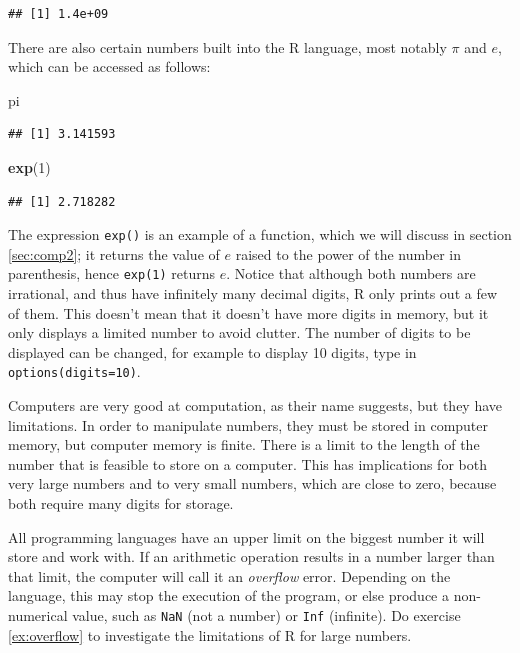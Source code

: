 \documentclass[
]{book}
\newenvironment{Shaded}{\begin{snugshade}}{\end{snugshade}}
\newcommand{\DecValTok}[1]{\textcolor[rgb]{0.00,0.00,0.81}{#1}}
\newcommand{\KeywordTok}[1]{\textcolor[rgb]{0.13,0.29,0.53}{\textbf{#1}}}
\newcommand{\NormalTok}[1]{#1}
\begin{document}
\begin{verbatim}
## [1] 1.4e+09
\end{verbatim}

There are also certain numbers built into the R language, most notably \(\pi\) and \(e\), which can be accessed as follows:

\begin{Shaded}
\begin{Highlighting}[]
\NormalTok{pi}
\end{Highlighting}
\end{Shaded}

\begin{verbatim}
## [1] 3.141593
\end{verbatim}

\begin{Shaded}
\begin{Highlighting}[]
\KeywordTok{exp}\NormalTok{(}\DecValTok{1}\NormalTok{)}
\end{Highlighting}
\end{Shaded}

\begin{verbatim}
## [1] 2.718282
\end{verbatim}

The expression \texttt{exp()} is an example of a function, which we will discuss in section \ref{sec:comp2}; it returns the value of \(e\) raised to the power of the number in parenthesis, hence \texttt{exp(1)} returns \(e\). Notice that although both numbers are irrational, and thus have infinitely many decimal digits, R only prints out a few of them. This doesn't mean that it doesn't have more digits in memory, but it only displays a limited number to avoid clutter. The number of digits to be displayed can be changed, for example to display 10 digits, type in \texttt{options(digits=10)}.

Computers are very good at computation, as their name suggests, but they have limitations. In order to manipulate numbers, they must be stored in computer memory, but computer memory is finite. There is a limit to the length of the number that is feasible to store on a computer. This has implications for both very large numbers and to very small numbers, which are close to zero, because both require many digits for storage.

All programming languages have an upper limit on the biggest number it will store and work with. If an arithmetic operation results in a number larger than that limit, the computer will call it an \emph{overflow} error. Depending on the language, this may stop the execution of the program, or else produce a non-numerical value, such as \texttt{NaN} (not a number) or \texttt{Inf} (infinite). Do exercise \ref{ex:overflow} to investigate the limitations of R for large numbers.
\end{document}
